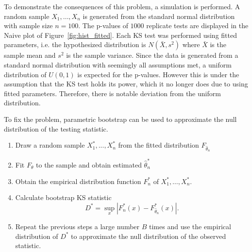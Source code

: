 \documentclass[12pt, letterpaper, titlepage]{article}
\begin{document}
To demonstrate the consequences of this problem, a simulation is performed. A 
random sample $X_1, \ldots, X_n$ is generated from the standard normal 
distribution with sample size $n = 100$. The p-values of $1000$ replicate tests 
are displayed in the Naive plot of Figure~\ref{fig:hist_fitted}. Each KS test 
was performed using fitted parameters, i.e. the hypothesized distribution is 
$N(\bar X, s^2)$ where $\bar X$ is the sample mean and $s^2$ is the sample 
variance. Since the data is generated from a standard normal distribution with 
seemingly all assumptions met, a uniform distribution of $U(0, 1)$ is expected 
for the p-values. However this is under the assumption that the KS test holds 
its power, which it no longer does due to using fitted parameters. Therefore, 
there is notable deviation from the uniform distribution. 


To fix the problem, parametric bootstrap can be used to approximate the null
distribution of the testing statistic. 
\begin{enumerate}
  \item 
    Draw a random sample $X_1^*,...,X_n^*$ from the fitted distribution 
    $F_{\hat\theta_n}$
  \item 
    Fit $F_\theta$ to the sample and obtain estimated $\hat\theta_n^*$
  \item
    Obtain the empirical distribution function $F_n^*$ of $X_1^*, \ldots, 
    X_n^*$.
  \item 
    Calculate bootstrap KS statistic
    \[
      D^* = \sup_x | F_n^* (x)- F_{\hat\theta_n}^*(x) |.
    \]
  \item
    Repeat the previous steps a large number $B$ times and use the empirical 
    distribution of $D^*$ to approximate the null distribution of the observed 
    statistic.    
\end{enumerate}
\end{document}
